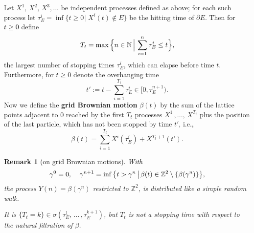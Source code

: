 \documentclass[11pt]{article}
\numberwithin{equation}{section}
\newtheorem*{remark}{Remark}
\begin{document}
Let $X^1,\, X^2, \, X^3,...$ be independent processes defined as above; 
for each such process let 
$\tau^i_E = \inf \{ t \geq 0 \,|\, X^i(t) \notin E\}$
be the hitting time of $\partial E$. 
Then for $t \geq 0$ define
$$ 
  T_t = \max \Big{\{} n \in \mathbb{N} 
  \,\Big|\, 
  \sum_{i=1}^n \tau^i_E \leq t
  \Big{\}},
$$
the largest number of stopping times $\tau^i_E$, 
which can elapse before time $t$. 
Furthermore, for $t\geq 0$ denote the overhanging time
$$
  t' :=  t - \sum_{i=1}^{T_t} \tau^i_E 
  \in [0,\tau^{n+1}_E).
$$
Now we define the \textbf{grid Brownian motion}
$\beta(t)$ by the sum of the lattice points adjacent to $0$ 
reached by the first $T_t$ processes
$X^1 \, ,..., \, X^{T_t}$ plus the position of the last particle,
which has not been stopped by time $t'$, i.e.,
\begin{equation}\label{eq: def of grid BM}
  \beta(t) = \sum_{i=1}^{T_t} X^i(\tau^i_E) + X^{T_t+1}(t').
\end{equation}

\begin{remark}[on grid Brownian motions]
  With 
  \begin{equation}
    \nonumber
    \gamma^0 = 0, \;\; \;\;
    \gamma^{n+1} = \inf \big{\{}
         t > \gamma^n \,\big|\,
   \beta (t) \in 
   \mathbb{Z}^2 \setminus \{\beta(\gamma^n)\}
   \big{\}},
  \end{equation}   
  the process $Y(n) = \beta(\gamma^n)$ restricted to
  $\mathbb{Z}^2$, is distributed like a simple random walk.

  It is $\{T_t = k\} \in 
  \sigma(\tau^1_E,\,...\,,\tau^{k+1}_E)$, 
  but $T_t$ is not a stopping time 
  with respect to the natural 
  filtration of $\beta$. 
\end{remark}
\end{document}
